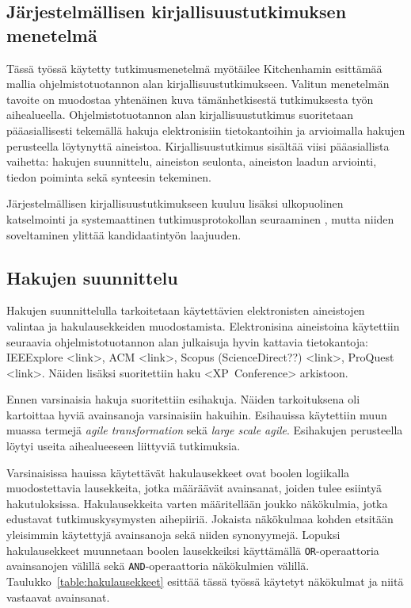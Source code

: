 \subsection{Järjestelmällisen kirjallisuustutkimuksen menetelmä}

Tässä työssä käytetty tutkimusmenetelmä myötäilee Kitchenhamin esittämää mallia
ohjelmistotuotannon alan kirjallisuustutkimukseen. Valitun menetelmän tavoite on
muodostaa yhtenäinen kuva tämänhetkisestä tutkimuksesta työn aihealueella.
Ohjelmistotuotannon alan kirjallisuustutkimus suoritetaan pääasiallisesti
tekemällä hakuja elektronisiin tietokantoihin ja arvioimalla hakujen perusteella
löytynyttä aineistoa. Kirjallisuustutkimus sisältää viisi pääasiallista
vaihetta: hakujen suunnittelu, aineiston seulonta, aineiston laadun arviointi,
tiedon poiminta sekä synteesin tekeminen. 

Järjestelmällisen kirjallisuustutkimukseen kuuluu lisäksi ulkopuolinen
katselmointi ja systemaattinen tutkimusprotokollan seuraaminen
, mutta niiden soveltaminen ylittää kandidaatintyön
laajuuden.

\subsection{Hakujen suunnittelu}
Hakujen suunnittelulla tarkoitetaan käytettävien elektronisten aineistojen
valintaa ja hakulausekkeiden muodostamista. Elektronisina aineistoina käytettiin
seuraavia ohjelmistotuotannon alan julkaisuja hyvin kattavia tietokantoja:
IEEExplore <link>, ACM <link>, Scopus (ScienceDirect??) <link>, ProQuest <link>.
Näiden lisäksi suoritettiin haku <XP~Conference> arkistoon.

Ennen varsinaisia hakuja suoritettiin esihakuja. Näiden tarkoituksena oli
kartoittaa hyviä avainsanoja varsinaisiin hakuihin. Esihauissa käytettiin muun
muassa termejä \textit{agile transformation} sekä \textit{large scale agile}.
Esihakujen perusteella löytyi useita aihealueeseen liittyviä tutkimuksia.

Varsinaisissa hauissa käytettävät hakulausekkeet ovat boolen logiikalla
muodostettavia lausekkeita, jotka määräävät avainsanat, joiden tulee esiintyä
hakutuloksissa. Hakulausekkeita varten määritellään joukko näkökulmia, jotka
edustavat tutkimuskysymysten aihepiiriä. Jokaista näkökulmaa kohden etsitään
yleisimmin käytettyjä avainsanoja sekä niiden synonyymejä. Lopuksi
hakulausekkeet muunnetaan boolen lausekkeiksi käyttämällä
\texttt{OR}-operaattoria avainsanojen välillä sekä \texttt{AND}-operaattoria
näkökulmien välillä. Taulukko~\ref{table:hakulausekkeet} esittää tässä työssä
käytetyt näkökulmat ja niitä vastaavat avainsanat.

